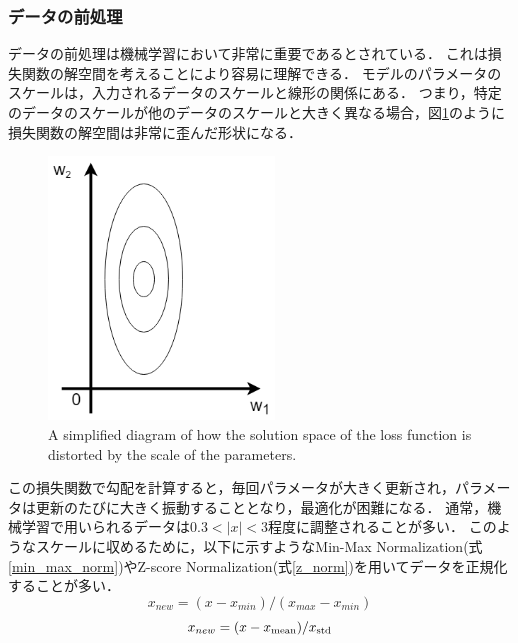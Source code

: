     \subsubsection{データの前処理}
    データの前処理は機械学習において非常に重要であるとされている．
    これは損失関数の解空間を考えることにより容易に理解できる．
    モデルのパラメータのスケールは，入力されるデータのスケールと線形の関係にある．
    つまり，特定のデータのスケールが他のデータのスケールと大きく異なる場合，図\ref{locc_func_scale}のように損失関数の解空間は非常に歪んだ形状になる．
    \begin{figure}[ht]
        \begin{center}
            \centering
            \includegraphics[width=6cm]{8_appendix/img/preprocess_lossfunc}
            \caption{A simplified diagram of how the solution space of the loss function is distorted by the scale of the parameters.}
            \label{locc_func_scale}
        \end{center}
    \end{figure}

    この損失関数で勾配を計算すると，毎回パラメータが大きく更新され，パラメータは更新のたびに大きく振動することとなり，最適化が困難になる．
    通常，機械学習で用いられるデータは$0.3<|x|<3$程度に調整されることが多い．
    このようなスケールに収めるために，以下に示すようなMin-Max Normalization(式\ref{min_max_norm})やZ-score Normalization(式\ref{z_norm})を用いてデータを正規化することが多い．
    \begin{equation}
        x_{new} = (x - x_{min}) / (x_{max} - x_{min})
        \label{min_max_norm}
    \end{equation}
    \begin{equation}
        x_{new} = (x - x_{\rm{mean}}) / x_{\rm{std}}
        \label{z_norm}
    \end{equation}

